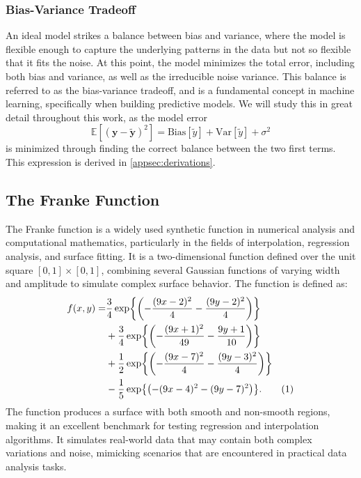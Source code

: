\documentclass[aps,pra,english,notitlepage,reprint,nofootinbib]{revtex4-1}  %
\newcommand\numberthis{\addtocounter{equation}{1}\tag{\theequation}}
\begin{document}
\subsubsection{Bias-Variance Tradeoff}
An ideal model strikes a balance between bias and variance, where the model is flexible enough to capture the underlying patterns in the data but not so flexible that it fits the noise. At this point, the model minimizes the total error, including both bias and variance, as well as the irreducible noise variance. This balance is referred to as the bias-variance tradeoff, and is a fundamental concept in machine learning, specifically when building predictive models. We will study this in great detail throughout this work, as the model error
\begin{equation}
  \mathbb{E}\left[(\mathbf{y}-\mathbf{\tilde{y}})^2 \right] = \text{Bias}[\tilde{y}] + \text{Var}[\tilde{y}] + \sigma^2 \label{eq:model error}
\end{equation}
is minimized through finding the correct balance between the two first terms. This expression is derived in \cref{appsec:derivations}.


\subsection{The Franke Function}\label{subsec:franke}
The Franke function is a widely used synthetic function in numerical analysis and computational mathematics, particularly in the fields of interpolation, regression analysis, and surface fitting. It is a two-dimensional function defined over the unit square $[0, 1] \times [0, 1]$, combining several Gaussian functions of varying width and amplitude to simulate complex surface behavior. The function is defined as:
\begin{align*}
  f(x,y) =& \frac{3}{4} \exp{\left( -\frac{(9x - 2)^2}{4} - \frac{(9y - 2)^2}{4} \right)} \\
&+ \frac{3}{4} \exp{\left( -\frac{(9x + 1)^2}{49} - \frac{9y + 1}{10} \right)} \\
&+ \frac{1}{2} \exp{\left( -\frac{(9x - 7)^2}{4} - \frac{(9y - 3)^2}{4} \right)} \\
&- \frac{1}{5} \exp{\left( -(9x - 4)^2 - (9y - 7)^2 \right)}. \numberthis
\end{align*}
The function produces a surface with both smooth and non-smooth regions, making it an excellent benchmark for testing regression and interpolation algorithms. It simulates real-world data that may contain both complex variations and noise, mimicking scenarios that are encountered in practical data analysis tasks.
\end{document}
